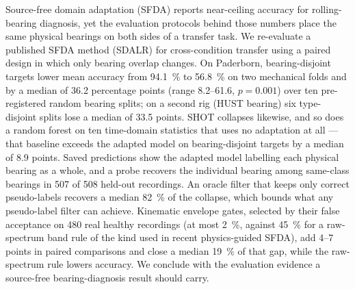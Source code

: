 Source-free domain adaptation (SFDA) reports near-ceiling accuracy for rolling-bearing diagnosis, yet the evaluation
protocols behind those numbers place the same physical bearings on both sides of a transfer task. We re-evaluate a published
SFDA method (SDALR) for cross-condition transfer using a paired design in which only bearing overlap changes. On Paderborn,
bearing-disjoint targets lower mean accuracy from \SI{94.1}{\percent} to \SI{56.8}{\percent} on two mechanical folds and by a
median of 36.2 percentage points (range 8.2--61.6, $p=0.001$) over ten pre-registered random bearing splits; on a second rig
(HUST bearing) six type-disjoint splits lose a median of 33.5 points. SHOT collapses likewise, and so does a random forest on
ten time-domain statistics that uses no adaptation at all --- that baseline exceeds the adapted model on bearing-disjoint
targets by a median of 8.9 points. Saved predictions show the adapted model labelling each physical bearing as a whole, and a
probe recovers the individual bearing among same-class bearings in 507 of 508 held-out recordings. An oracle filter that keeps
only correct pseudo-labels recovers a median \SI{82}{\percent} of the collapse, which bounds what any pseudo-label filter can
achieve. Kinematic envelope gates, selected by their false acceptance on 480 real healthy recordings (at most
\SI{2}{\percent}, against \SI{45}{\percent} for a raw-spectrum band rule of the kind used in recent physics-guided SFDA), add
4--7 points in paired comparisons and close a median \SI{19}{\percent} of that gap, while the raw-spectrum rule lowers
accuracy. We conclude with the evaluation evidence a source-free bearing-diagnosis result should carry.
